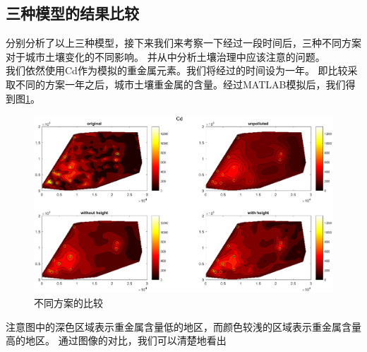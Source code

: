 \documentclass[a4paper]{article}
\begin{document}
\subsection{三种模型的结果比较}
分别分析了以上三种模型，接下来我们来考察一下经过一段时间后，三种不同方案对于城市土壤变化的不同影响。
并从中分析土壤治理中应该注意的问题。\\
\indent 我们依然使用Cd作为模拟的重金属元素。我们将经过的时间设为一年。
即比较采取不同的方案一年之后，城市土壤重金属的含量。经过MATLAB模拟后，我们得到图\ref{fig:different-model-comparison-of-Cd}。
\begin{figure}[H]
    \centerline{
    \includegraphics[scale=0.5]{pictures/different-model-comparison-of-Cd.eps}}
    \caption{不同方案的比较}
    \label{fig:different-model-comparison-of-Cd}
\end{figure}
注意图中的深色区域表示重金属含量低的地区，而颜色较浅的区域表示重金属含量高的地区。
通过图像的对比，我们可以清楚地看出
\end{document}

